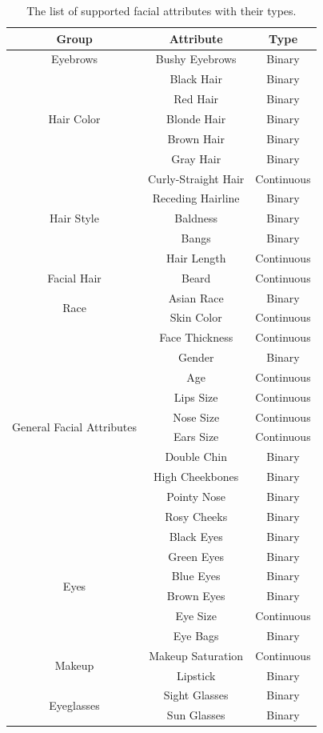 \begin{table}[H]
\centering
\caption{The list of supported facial attributes with their types.}
\begin{tabular}[t]{| c | c | c |}
\hline
Group & Attribute & Type \\
\hline \hline
Eyebrows & Bushy Eyebrows & Binary \\
\hline
\multirow{5}{*}{Hair Color} &  Black Hair & Binary \\
& Red Hair & Binary \\
& Blonde Hair & Binary \\
& Brown Hair & Binary \\
& Gray Hair & Binary \\
\hline
\multirow{5}{*}{Hair Style} & Curly-Straight Hair & Continuous \\
& Receding Hairline & Binary \\
& Baldness & Binary \\
& Bangs & Binary \\
& Hair Length & Continuous \\
\hline
Facial Hair & Beard & Continuous \\
\hline
\multirow{2}{*}{Race} & Asian Race & Binary \\
& Skin Color & Continuous \\
\hline
\multirow{10}{*}{General Facial Attributes} & Face Thickness & Continuous \\
& Gender & Binary \\
& Age & Continuous \\
& Lips Size & Continuous \\
& Nose Size & Continuous \\
& Ears Size & Continuous \\
& Double Chin & Binary \\
& High Cheekbones & Binary \\
& Pointy Nose & Binary \\
& Rosy Cheeks & Binary \\
\hline
\multirow{6}{*}{Eyes} & Black Eyes & Binary \\
& Green Eyes & Binary \\
& Blue Eyes & Binary \\
& Brown Eyes & Binary \\
& Eye Size & Continuous \\
& Eye Bags & Binary \\
\hline
\multirow{2}{*}{Makeup} & Makeup Saturation & Continuous \\
& Lipstick & Binary \\
\hline
\multirow{2}{*}{Eyeglasses} & Sight Glasses & Binary \\
& Sun Glasses & Binary \\
\hline
\end{tabular}
\label{tab:facial_att}
\end{table}

